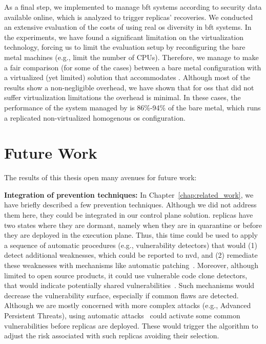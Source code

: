 As a final step, we implemented \system to manage \gls{bft} systems according to security data available online, which is analyzed to trigger replicas' recoveries.
We conducted an extensive evaluation of the costs of using real \gls{os} diversity in \gls{bft} systems.
In the experiments, we have found a significant limitation on the virtualization technology, forcing us to limit the evaluation setup by reconfiguring the bare metal machines (e.g., limit the number of CPUs).
Therefore, we manage to make a fair comparison (for some of the cases) between a bare metal configuration with a virtualized (yet limited) solution that accommodates \system.
Although most of the results show a non-negligible overhead, we have shown that for \glspl{os} that did not suffer virtualization limitations the overhead is minimal.
In these cases, the performance of the system managed by \system is 86\%-94\% of the bare metal, which runs a replicated non-virtualized homogenous \gls{os} configuration.



\section{Future Work}
The results of this thesis open many avenues for future work:


\textbf{Integration of prevention techniques:}
In Chapter~\ref{chap:related_work}, we have briefly described a few prevention techniques.
Although we did not address them here, they could be integrated in our control plane solution.
\system replicas have two states where they are dormant, namely when they are in quarantine or before they are deployed in the execution plane.
Thus, this time could be used to apply a sequence of automatic procedures (e.g., vulnerability detectors) that would (1) detect additional weaknesses, which could be reported to \gls{nvd}, and (2) remediate these weaknesses with mechanisms like automatic patching~\cite{Huang:2016}.
Moreover, although limited to open source products, it could use vulnerable code clone detectors, that would indicate potentially shared vulnerabilities~\cite{Kim:2017a,Xu:2017b}.
Such mechanisms would decrease the vulnerability surface, especially if common flaws are detected.
Although we are mostly concerned with more complex attacks (e.g., Advanced Persistent Threats), using automatic attacks~\cite{Hu:2015} could activate some common vulnerabilities before replicas are deployed.
These would trigger the algorithm to adjust the risk associated with such replicas avoiding their selection.


